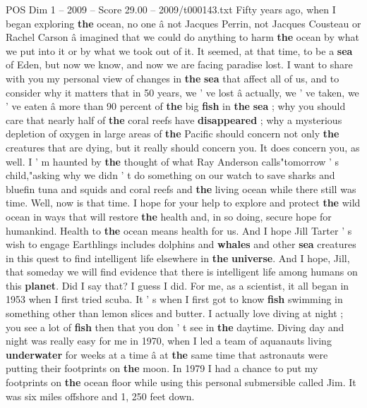 \begin{textsample}{POS Dim 1 – 2009 – Score 29.00 – 2009/t000143.txt}  \label{ex:f1_pos_029}
Fifty years ago, when I began exploring \textbf{the} ocean, no one â not Jacques Perrin, not Jacques Cousteau or Rachel Carson â imagined that we could do anything to harm \textbf{the} ocean by what we put into it or by what we took out of it.
It seemed, at that time, to be a \textbf{sea} of Eden, but now we know, and now we are facing paradise lost.
I want to share with you my personal view of changes in \textbf{the} \textbf{sea} that affect all of us, and to consider why it matters that in 50 years, we ' ve lost â actually, we ' ve taken, we ' ve eaten â more than 90 percent of \textbf{the} big \textbf{fish} in \textbf{the} \textbf{sea} ; why you should care that nearly half of \textbf{the} coral reefs have \textbf{disappeared} ; why a mysterious depletion of oxygen in large areas of \textbf{the} Pacific should concern not only \textbf{the} creatures that are dying, but it really should concern you.
It does concern you, as well.
I ' m haunted by \textbf{the} thought of what Ray Anderson calls"tomorrow ' s child,"asking why we didn ' t do something on our watch to save sharks and bluefin tuna and squids and coral reefs and \textbf{the} living ocean while there still was time.
Well, now is that time.
I hope for your help to explore and protect \textbf{the} wild ocean in ways that will restore \textbf{the} health and, in so doing, secure hope for humankind.
Health to \textbf{the} ocean means health for us.
And I hope Jill Tarter ' s wish to engage Earthlings includes dolphins and \textbf{whales} and other \textbf{sea} creatures in this quest to find intelligent life elsewhere in \textbf{the} \textbf{universe}.
And I hope, Jill, that someday we will find evidence that there is intelligent life among humans on this \textbf{planet}.
Did I say that?
I guess I did.
For me, as a scientist, it all began in 1953 when I first tried scuba.
It ' s when I first got to know \textbf{fish} swimming in something other than lemon slices and butter.
I actually love diving at night ; you see a lot of \textbf{fish} then that you don ' t see in \textbf{the} daytime.
Diving day and night was really easy for me in 1970, when I led a team of aquanauts living \textbf{underwater} for weeks at a time â at \textbf{the} same time that astronauts were putting their footprints on \textbf{the} moon.
In 1979 I had a chance to put my footprints on \textbf{the} ocean floor while using this personal submersible called Jim.
It was six miles offshore and 1, 250 feet down.

\end{textsample}
